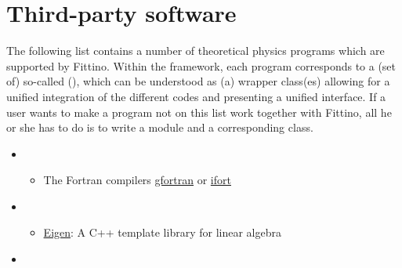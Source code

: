 \documentclass[letterpaper,10pt,english]{sphinxmanual}
\begin{document}
\section{Third-party software}
\label{third_party_software::doc}\label{third_party_software:third-party-software}
The following list contains a number of theoretical physics programs which are supported by Fittino.
Within the framework, each program corresponds to a (set of) so-called  (), which
can be understood as (a) wrapper class(es) allowing for a unified integration of the different codes
and presenting a unified interface. If a user wants to make a program not on this list work together
with Fittino, all he or she has to do is to write a  module and a corresponding
 class.
\begin{itemize}
\item {} 
\begin{itemize}
\item {} 
The Fortran compilers \href{https://gcc.gnu.org/wiki/GFortran}{gfortran} or \href{https://software.intel.com/en-us/fortran-compilers}{ifort}

\end{itemize}

\item {} 
\begin{itemize}
\item {} 
\href{http://eigen.tuxfamily.org/index.php?title=Main\_Page}{Eigen}: A C++ template library for
linear algebra

\end{itemize}

\item {} 


\end{itemize}
\end{document}
